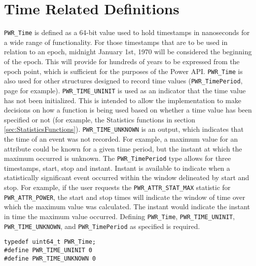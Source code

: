 \section{Time Related Definitions}\label{sec:TimeRelatedDefinitions}

\texttt{PWR_Time} is defined as a 64-bit value used to hold timestamps in nanoseconds for a wide range of functionality. 
For those timestamps that are to be used in relation to an epoch, midnight January 1st, 1970 will be considered the beginning of the epoch.
This will provide for hundreds of years to be expressed from the epoch point, which is sufficient for the purposes of the Power API.
\texttt{PWR_Time} is also used for other structures designed to record time values (\texttt{PWR_TimePeriod}, page \pageref{type:TimePeriod} for example). 
\texttt{PWR_TIME_UNINIT} is used as an indicator that the time value has not been initialized. 
This is intended to allow the implementation to make decisions on how a function is being used based on whether a time value has been specified or not (for example, the Statistics functions in section \ref{sec:StatisticsFunctions}).
\texttt{PWR_TIME_UNKNOWN} is an output, which indicates that the time of an event was not recorded. For example, a maximum value for an attribute could be known for a given time period, but the instant at which the maximum occurred is unknown.
The \texttt{PWR_TimePeriod} type allows for three timestamps, start, stop and instant. 
Instant is available to indicate when a statistically significant event occurred within the window delineated by start and stop.
For example, if the user requests the \texttt{PWR_ATTR_STAT_MAX} statistic for \texttt{PWR_ATTR_POWER}, the start and stop times will indicate the window of time over which the maximum value was calculated. 
The instant would indicate the instant in time the maximum value occurred.
Defining \texttt{PWR_Time}, \texttt{PWR_TIME_UNINIT}, \texttt{PWR_TIME_UNKNOWN}, and \texttt{PWR_TimePeriod} as specified is required.



\begin{center}
\begin{minipage}{.95\linewidth}%
\begin{lstlisting}
typedef uint64_t PWR_Time;
#define PWR_TIME_UNINIT 0
#define PWR_TIME_UNKNOWN 0 
\end{lstlisting}
\end{minipage}
\end{center}

